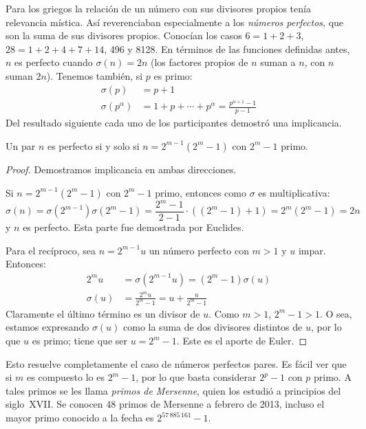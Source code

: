   Para los griegos
  la relación de un número con sus divisores propios
  tenía relevancia mística.
  Así reverenciaban especialmente a los \emph{números perfectos},%
  que son la suma de sus divisores propios.
  Conocían los casos \(6 = 1 + 2 + 3\),
  \(28 = 1 + 2 + 4 + 7 + 14\),
  496 y 8128.
  En términos de las funciones definidas antes,
  \(n\) es perfecto cuando \(\sigma(n) = 2 n\)
  (los factores propios de \(n\) suman a \(n\),
   con \(n\) suman \(2 n\)).
  Tenemos también,
  si \(p\) es primo:
  \begin{align*}
    \sigma(p)
      &= p + 1 \\
    \sigma(p^\alpha)
      &= 1 + p + \dotsb + p^\alpha
       = \frac{p^{\alpha + 1} - 1}{p - 1}
  \end{align*}
  Del resultado siguiente cada uno de los participantes
  demostró una implicancia.
  \begin{theorem}
    \label{theo:even-perfect-numbers}
    Un par \(n\) es perfecto si y solo si
    \(n = 2^{m - 1} \left( 2^m - 1 \right)\) con \(2^m - 1\) primo.
  \end{theorem}
  \begin{proof}
    Demostramos implicancia en ambas direcciones.

    Si \(n = 2^{m - 1} \left( 2^m - 1 \right)\)
    con \(2^m - 1\) primo,
    entonces como \(\sigma\) es multiplicativa:%
    \begin{equation*}
      \sigma(n)
	= \sigma \left( 2^{m - 1} \right)
	    \sigma \left( 2^m - 1 \right)
	= \frac{2^m - 1}{2 - 1} \cdot \left( (2^m - 1) + 1 \right)
	= 2^m \left( 2^m - 1 \right)
	= 2 n
    \end{equation*}
    y \(n\) es perfecto.
    Esta parte fue demostrada por Euclides.%

    Para el recíproco,
    sea \(n = 2^{m - 1} u\) un número perfecto
    con \(m > 1\) y \(u\) impar.
    Entonces:
    \begin{align*}
      2^m u
	&= \sigma \left( 2^{m - 1} u \right)
	 = \left( 2^m - 1 \right) \sigma(u) \\
      \sigma(u)
	&= \frac{2^m u}{2^m - 1}
	 = u + \frac{u}{2^m - 1}
    \end{align*}
    Claramente el último término es un divisor de \(u\).
    Como \(m > 1\),
    \(2^m - 1 > 1\).
    O sea,
    estamos expresando \(\sigma(u)\)%
    como la suma de dos divisores distintos de \(u\),
    por lo que \(u\) es primo;
    tiene que ser \(u = 2^m - 1\).
    Este es el aporte de Euler.%
  \end{proof}
  Esto resuelve completamente el caso de números perfectos pares.
  Es fácil ver que si \(m\) es compuesto
  lo es \(2^m - 1\),
  por lo que basta considerar \(2^p - 1\) con \(p\) primo.
  A tales primos se les llama \emph{primos de Mersenne},%
  quien los estudió a principios del siglo~XVII.
  Se conocen 48 primos de Mersenne a febrero de 2013,
  incluso el mayor primo conocido a la fecha
  es \(2^{57\,885\,161} - 1\).

